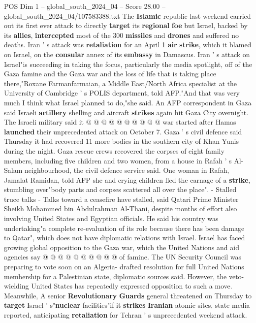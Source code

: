\begin{textsample}{POS Dim 1 – global\_south\_2024\_04 – Score 28.00 – global\_south\_2024\_04/107583388.txt}
The \textbf{Islamic} republic last weekend carried out its first ever attack to directly \textbf{target} its \textbf{regional} \textbf{foe} but Israel, backed by its \textbf{allies}, \textbf{intercepted} most of the 300 \textbf{missiles} and \textbf{drones} and suffered no deaths.
Iran ' s attack was \textbf{retaliation} for an April 1 \textbf{air} \textbf{strike}, which it blamed on Israel, on the \textbf{consular} annex of its \textbf{embassy} in Damascus.
Iran ' s attack on Israel"is succeeding in taking the focus, particularly the media spotlight, off of the Gaza famine and the Gaza war and the loss of life that is taking place there,"Roxane Farmanfarmaian, a Middle East/North Africa specialist at the University of Cambridge ' s POLIS department, told AFP."And that was very much I think what Israel planned to do,"she said.
An AFP correspondent in Gaza said Israeli \textbf{artillery} shelling and aircraft \textbf{strikes} again hit Gaza City overnight.
The Israeli military said it @ @ @ @ @ @ @ @ @ @ war started after Hamas \textbf{launched} their unprecedented attack on October 7.
Gaza ' s civil defence said Thursday it had recovered 11 more bodies in the southern city of Khan Yunis during the night.
Gaza rescue crews recovered the corpses of eight family members, including five children and two women, from a house in Rafah ' s Al-Salam neighbourhood, the civil defence service said.
One woman in Rafah, Jamalat Ramidan, told AFP she and crying children fled the carnage of a \textbf{strike}, stumbling over"body parts and corpses scattered all over the place". - Stalled truce talks - Talks toward a ceasefire have stalled, said Qatari Prime Minister Sheikh Mohammed bin Abdulrahman Al-Thani, despite months of effort also involving United States and Egyptian officials.
He said his country was undertaking"a complete re-evaluation of its role because there has been damage to Qatar", which does not have diplomatic relations with Israel.
Israel has faced growing global opposition to the Gaza war, which the United Nations and aid agencies say @ @ @ @ @ @ @ @ @ @ of famine.
The UN Security Council was preparing to vote soon on an Algeria- drafted resolution for full United Nations membership for a Palestinian state, diplomatic sources said.
However, the veto-wielding United States has repeatedly expressed opposition to such a move.
Meanwhile, A senior \textbf{Revolutionary} \textbf{Guards} general threatened on Thursday to \textbf{target} Israel ' s"\textbf{nuclear} facilities"if it \textbf{strikes} \textbf{Iranian} atomic sites, state media reported, anticipating \textbf{retaliation} for Tehran ' s unprecedented weekend attack.

\end{textsample}
